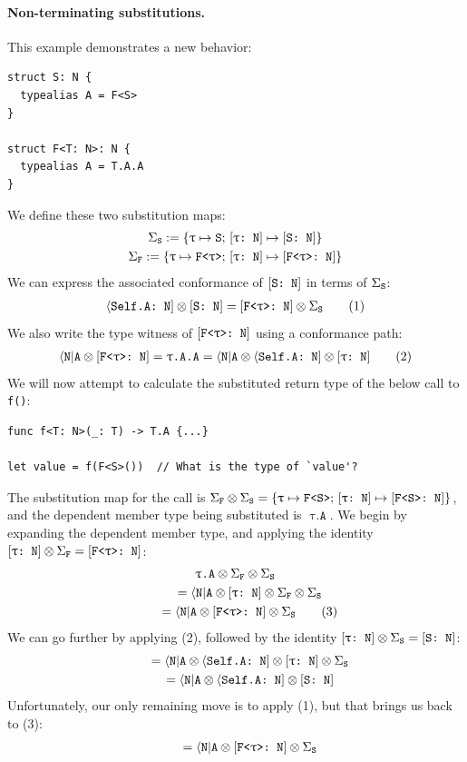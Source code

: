 \documentclass[../generics]{subfiles}
\begin{document}
\paragraph{Non-terminating substitutions.}
This example demonstrates a new behavior:
\begin{Verbatim}
struct S: N {
  typealias A = F<S>
}

struct F<T: N>: N {
  typealias A = T.A.A
}
\end{Verbatim}
We define these two substitution maps:
\begin{gather*} \Sigma_\texttt{S}:=\{\texttt{$\uptau$} \mapsto \texttt{S};\,[\texttt{$\uptau$:~N}] \mapsto [\texttt{S:~N}]\}\\
\Sigma_\texttt{F} := \{\texttt{$\uptau$} \mapsto \texttt{F<$\uptau$>};\,[\texttt{$\uptau$:~N}] \mapsto [\texttt{F<$\uptau$>:~N}]\}
\end{gather*}
We can express the associated conformance of $[\texttt{S:~N}]$ in terms of $\Sigma_\texttt{S}$:
\begin{gather*}
\langle\texttt{Self.A:~N}] \otimes [\texttt{S:~N}] = [\texttt{F<$\uptau$>:~N}]\otimes \Sigma_\texttt{S} \tag{1}
\end{gather*}
We also write the type witness of $[\texttt{F<$\uptau$>:~N}]$ using a conformance path:
\begin{gather*}
\langle\texttt{N}|\texttt{A} \otimes [\texttt{F<$\uptau$>:~N}] = \texttt{$\uptau$.A.A} = \langle\texttt{N}|\texttt{A} \otimes \langle\texttt{Self.A:~N}] \otimes [\texttt{$\uptau$:~N}] \tag{2}
\end{gather*}
We will now attempt to calculate the substituted return type of the below call to \verb|f()|:
\begin{Verbatim}
func f<T: N>(_: T) -> T.A {...}

let value = f(F<S>())  // What is the type of `value'?
\end{Verbatim}
The substitution map for the call is $\Sigma_\texttt{F} \otimes \Sigma_\texttt{S} = \{\texttt{$\uptau$} \mapsto \texttt{F<S>};\,[\texttt{$\uptau$:~N}] \mapsto [\texttt{F<S>:~N}]\}$, and the dependent member type being substituted is $\texttt{$\uptau$.A}$. We begin by expanding the dependent member type, and applying the identity $[\texttt{$\uptau$:~N}] \otimes \Sigma_\texttt{F} = [\texttt{F<$\uptau$>:~N}]$:
\begin{gather*}
\texttt{$\uptau$.A} \otimes \Sigma_\texttt{F}\otimes\Sigma_\texttt{S} \\
\qquad {} = \langle\texttt{N}|\texttt{A} \otimes [\texttt{$\uptau$:~N}] \otimes \Sigma_\texttt{F}\otimes\Sigma_\texttt{S}\\
\qquad {} = \langle\texttt{N}|\texttt{A} \otimes [\texttt{F<$\uptau$>:~N}] \otimes \Sigma_\texttt{S} \tag{3}
\end{gather*}
We can go further by applying (2), followed by the identity $[\texttt{$\uptau$:~N}] \otimes \Sigma_\texttt{S}=[\texttt{S:~N}]$:
\begin{gather*}
\qquad {} = \langle\texttt{N}|\texttt{A} \otimes \langle\texttt{Self.A:~N}] \otimes [\texttt{$\uptau$:~N}] \otimes \Sigma_\texttt{S}\\
\qquad {} = \langle\texttt{N}|\texttt{A} \otimes \langle\texttt{Self.A:~N}] \otimes [\texttt{S:~N}]
\end{gather*}
Unfortunately, our only remaining move is to apply (1), but that brings us back to (3):
\begin{gather*}
\qquad {} = \langle\texttt{N}|\texttt{A} \otimes [\texttt{F<$\uptau$>:~N}] \otimes \Sigma_\texttt{S}
\end{gather*}
\end{document}
